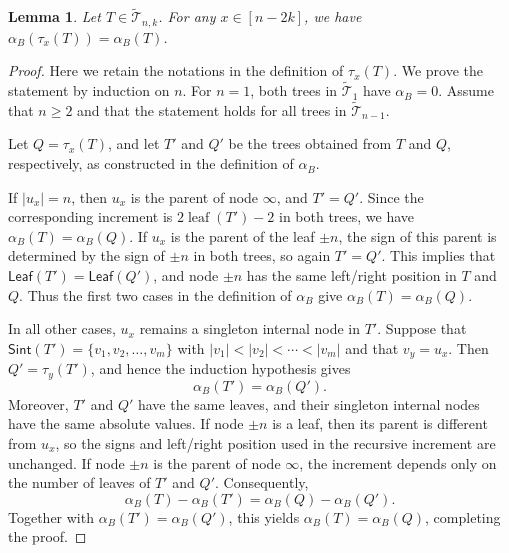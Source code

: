 \documentclass[12pt]{article}
\numberwithin{equation}{section}
\theoremstyle{plain}
\newtheorem{lemma}[theorem]{Lemma}
\def\Leaf{\mathsf{Leaf}}
\def\Sint{\mathsf{Sint}}
\def\B{\mathcal{T}}
\begin{document}
	 				\begin{lemma}\label{lem-alpha-B}
	 					Let $T\in \widetilde{\B}_{n,k}$. For any $x\in [n-2k]$, we have $\alpha_B(\tau_x(T))=\alpha_B(T)$. 
	 					\end{lemma}
	 				\begin{proof}
	 					Here we retain the notations in the definition of $\tau_x(T)$. 
	 					We prove the statement by induction on $n$. For $n=1$, both trees in
	 					$\widetilde{\mathcal T}_1$ have $\alpha_B=0$. Assume that $n\geq 2$
	 					and that the statement holds for all trees in
	 					$\widetilde{\mathcal T}_{n-1}$.
	 					
	 					
	 					Let $Q=\tau_x(T)$, and let $T'$ and $Q'$ be the trees obtained from
	 					$T$ and $Q$, respectively,  as constructed in the definition
	 					of $\alpha_B$.
	 					
	 					If $|u_x|=n$, then $u_x$ is the parent of node $\infty$, and
	 					$T'=Q'$. Since the corresponding increment is
	 					$2\operatorname{leaf}(T')-2$ in both trees, we have
	 					$\alpha_B(T)=\alpha_B(Q)$.
	 					If $u_x$ is the parent of the leaf $\pm n$,   the sign  of this 
	 					parent  is determined by the sign of $\pm n$ in both trees, so again $T'=Q'$.
	 			This implies that
	 					$\Leaf(T')=\Leaf(Q')$, and node $\pm n$
	 					has the same left/right position in $T$ and $Q$. Thus the first
	 					two cases in the definition of $\alpha_B$ give
	 					$\alpha_B(T)=\alpha_B(Q)$.
	 					
	 					In all other cases, $u_x$ remains a singleton internal node in
	 					$T'$.  Suppose that 
	 					$\Sint(T')=\{v_1, v_2, \ldots, v_m\}$  with $|v_1|<|v_2|<\cdots<|v_m|$ and that $v_y=u_x$.   Then
	 					$Q'=\tau_y(T')$, and hence the induction hypothesis gives
	 					\[
	 					\alpha_B(T')=\alpha_B(Q').
	 					\]
	 					Moreover, $T'$ and $Q'$ have the same leaves, and their singleton
	 					internal nodes have the same absolute values. If node $\pm n$ is a leaf,  then its parent is different
	 					from $u_x$, so the signs and left/right position used
	 					in the recursive increment are unchanged. If node $\pm n$
	 					is the parent of node $\infty$, the increment depends only
	 					on the number of leaves of $T'$ and $Q'$.   Consequently,
	 					\[
	 					\alpha_B(T)-\alpha_B(T')
	 					=
	 					\alpha_B(Q)-\alpha_B(Q').
	 					\]
	 					Together with $\alpha_B(T')=\alpha_B(Q')$, this yields
	 					$\alpha_B(T)=\alpha_B(Q)$, completing the proof.
	 				\end{proof}
	 				
\end{document}
